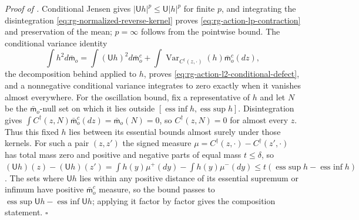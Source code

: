 \noindent\emph{Proof of .}
Conditional Jensen gives $\lvert\mathsf Uh\rvert^p\le\mathsf U\lvert h\rvert^p$ for
finite $p$, and integrating the disintegration
\eqref{eq:rg-normalized-reverse-kernel} proves
\eqref{eq:rg-action-lp-contraction} and preservation of the mean; $p=\infty$
follows from the pointwise bound. The conditional variance identity
\begin{equation}
\int h^2d\bar{\mathsf m}_o
=\int(\mathsf Uh)^2d\bar{\mathsf m}_o^c
+\int\operatorname{Var}_{C^\dagger(z,\cdot)}(h)\bar{\mathsf m}_o^c(dz),
\label{eq:rg-action-total-conditional-variance}
\end{equation}
the decomposition behind  applied to $h$, proves
\eqref{eq:rg-action-l2-conditional-defect}, and a nonnegative conditional variance
integrates to zero exactly when it vanishes almost everywhere. For the oscillation
bound, fix a representative of $h$ and let $N$ be the $\bar{\mathsf m}_o$-null set on which it
lies outside $[\operatorname{ess~inf}h,\operatorname{ess~sup}h]$. Disintegration gives
$\int C^\dagger(z,N)\bar{\mathsf m}_o^c(dz)=\bar{\mathsf m}_o(N)=0$, so
$C^\dagger(z,N)=0$ for almost every $z$. Thus this fixed $h$ lies between its essential bounds
almost surely under those kernels. For such a pair
$(z,z')$ the signed measure $\mu=C^\dagger(z,\cdot)-C^\dagger(z',\cdot)$ has total
mass zero and positive and negative parts of equal mass $t\le\delta$, so
$(\mathsf Uh)(z)-(\mathsf Uh)(z')=\int h(y)\mu^+(dy)-\int h(y)\mu^-(dy)
\le t(\operatorname{ess~sup}h-\operatorname{ess~inf}h)$. The sets where
$\mathsf Uh$ lies within any positive distance of its essential supremum or
infimum have positive $\bar{\mathsf m}_o^c$ measure, so the bound passes to
$\operatorname{ess~sup}\mathsf Uh-\operatorname{ess~inf}\mathsf Uh$; applying it
factor by factor gives the composition statement. $\square$

